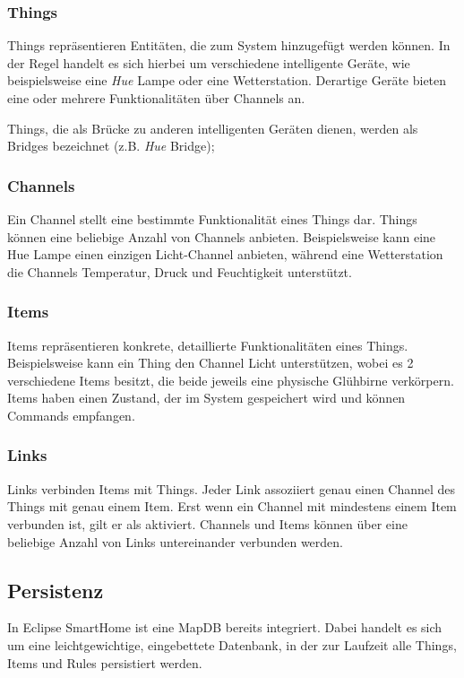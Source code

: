 \subsubsection{Things}
Things repräsentieren Entitäten, die zum System hinzugefügt werden können. In der Regel handelt es sich hierbei um verschiedene intelligente Geräte, wie beispielsweise eine \textit{Hue} Lampe oder eine Wetterstation. Derartige Geräte bieten eine oder mehrere Funktionalitäten über Channels an.

Things, die als Brücke zu anderen intelligenten Geräten dienen, werden als Bridges bezeichnet (z.B. \textit{Hue} Bridge);

\subsubsection{Channels}
Ein Channel stellt eine bestimmte Funktionalität eines Things dar. Things können eine beliebige Anzahl von Channels anbieten. Beispielsweise kann eine Hue Lampe einen einzigen \glqq Licht\grqq -Channel anbieten, während eine Wetterstation die Channels \glqq Temperatur\grqq , \glqq Druck\grqq{} und \glqq Feuchtigkeit\grqq{} unterstützt.

\subsubsection{Items}
Items repräsentieren konkrete, detaillierte Funktionalitäten eines Things. Beispielsweise kann ein Thing den Channel \glqq Licht\grqq{} unterstützen, wobei es 2 verschiedene Items besitzt, die beide jeweils eine physische Glühbirne verkörpern. Items haben einen Zustand, der im System gespeichert wird und können Commands empfangen.

\subsubsection{Links}
Links verbinden Items mit Things. Jeder Link assoziiert genau einen Channel des Things mit genau einem Item. Erst wenn ein Channel mit mindestens einem Item verbunden ist, gilt er als \glqq aktiviert\grqq{}. Channels und Items können über eine beliebige Anzahl von Links untereinander verbunden werden.


\subsection{Persistenz}
\label{subsec:persistenz}
In Eclipse SmartHome ist eine MapDB bereits integriert. Dabei handelt es sich um eine leichtgewichtige, eingebettete Datenbank, in der zur Laufzeit alle Things, Items und Rules persistiert werden. 


